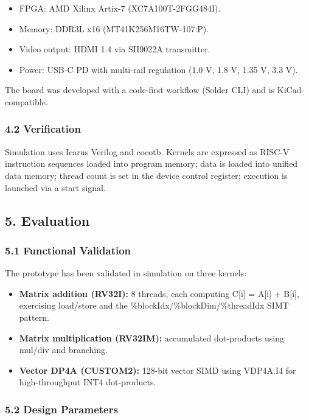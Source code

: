 \begin{itemize}
\tightlist
\item
  FPGA: AMD Xilinx Artix-7 (XC7A100T-2FGG484I).
\item
  Memory: DDR3L x16 (MT41K256M16TW-107:P).
\item
  Video output: HDMI 1.4 via SII9022A transmitter.
\item
  Power: USB-C PD with multi-rail regulation (1.0 V, 1.8 V, 1.35 V, 3.3
  V).
\end{itemize}

The board was developed with a code-first workflow (Solder CLI) and is
KiCad-compatible.

\subsubsection{4.2 Verification}\label{42-verification}

Simulation uses Icarus Verilog and cocotb. Kernels are expressed as
RISC-V instruction sequences loaded into program memory; data is loaded
into unified data memory; thread count is set in the device control
register; execution is launched via a start signal.

\subsection{5. Evaluation}\label{5-evaluation}

\subsubsection{5.1 Functional
Validation}\label{51-functional-validation}

The prototype has been validated in simulation on three kernels:

\begin{itemize}
\tightlist
\item
  \textbf{Matrix addition (RV32I):} 8 threads, each computing C{[}i{]} =
  A{[}i{]} + B{[}i{]}, exercising load/store and the
  \%blockIdx/\%blockDim/\%threadIdx SIMT pattern.
\item
  \textbf{Matrix multiplication (RV32IM):} accumulated dot-products
  using mul/div and branching.
\item
  \textbf{Vector DP4A (CUSTOM2):} 128-bit vector SIMD using VDP4A.I4 for
  high-throughput INT4 dot-products.
\end{itemize}

\subsubsection{5.2 Design Parameters}\label{52-design-parameters}

